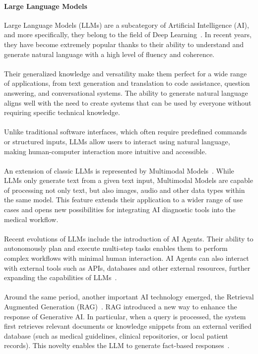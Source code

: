 \documentclass{scrartcl}
\begin{document}
\paragraph{Large Language Models}\label{llm-background}{Large Language Models (LLMs) are a subcategory of Artificial Intelligence (AI), and more specifically, they belong to the field of Deep Learning~\cite{vaswani2017}. In recent years, they have become extremely popular thanks to their ability to understand and generate natural language with a high level of fluency and coherence.
\\\\
Their generalized knowledge and versatility make them perfect for a wide range of applications, from text generation and translation to code assistance, question answering, and conversational systems.
The ability to generate natural language aligns well with the need to create systems that can be used by everyone without requiring specific technical knowledge.
\\\\
Unlike traditional software interfaces, which often require predefined commands or structured inputs, LLMs allow users to interact using natural language, making human-computer interaction more intuitive and accessible.
\\\\
An extension of classic LLMs is represented by Multimodal Models~\cite{huang2024}. While LLMs only generate text from a given text input, Multimodal Models are capable of processing not only text, but also images, audio and other data types within the same model. This feature extends their application to a wider range of use cases and opens new possibilities for integrating AI diagnostic tools into the medical workflow.
\\\\
Recent evolutions of LLMs include the introduction of AI Agents. Their ability to autonomously plan and execute multi-step tasks enables them to perform complex workflows with minimal human interaction. AI Agents can also interact with external tools such as APIs, databases and other external resources, further expanding the capabilities of LLMs~\cite{xi2023}.
\\\\
Around the same period, another important AI technology emerged, the Retrieval Augmented Generation (RAG)~\cite{rag2020}. RAG introduced a new way to enhance the response of Generative AI. In particular, when a query is processed, the system first retrieves relevant documents or knowledge snippets from an external verified database (such as medical guidelines, clinical repositories, or local patient records). This novelty enables the LLM to generate fact-based responses~\cite{rag2020}.}
\end{document}
